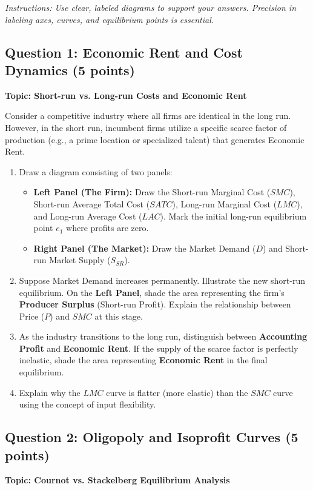 \documentclass[12pt, a4paper]{article}
\begin{document}
\textit{Instructions: Use clear, labeled diagrams to support your answers. Precision in labeling axes, curves, and equilibrium points is essential.}

\subsection*{Question 1: Economic Rent and Cost Dynamics (5 points)}
\textbf{Topic: Short-run vs. Long-run Costs and Economic Rent}

Consider a competitive industry where all firms are identical in the long run. However, in the short run, incumbent firms utilize a specific scarce factor of production (e.g., a prime location or specialized talent) that generates Economic Rent.

\begin{enumerate}
    \item[(a)] Draw a diagram consisting of two panels:
    \begin{itemize}
        \item \textbf{Left Panel (The Firm):} Draw the Short-run Marginal Cost ($SMC$), Short-run Average Total Cost ($SATC$), Long-run Marginal Cost ($LMC$), and Long-run Average Cost ($LAC$). Mark the initial long-run equilibrium point $e_1$ where profits are zero.
        \item \textbf{Right Panel (The Market):} Draw the Market Demand ($D$) and Short-run Market Supply ($S_{SR}$).
    \end{itemize}
    \item[(b)] Suppose Market Demand increases permanently. Illustrate the new short-run equilibrium. On the \textbf{Left Panel}, shade the area representing the firm's \textbf{Producer Surplus} (Short-run Profit). Explain the relationship between Price ($P$) and $SMC$ at this stage.
    \item[(c)] As the industry transitions to the long run, distinguish between \textbf{Accounting Profit} and \textbf{Economic Rent}. If the supply of the scarce factor is perfectly inelastic, shade the area representing \textbf{Economic Rent} in the final equilibrium.
    \item[(d)] Explain why the $LMC$ curve is flatter (more elastic) than the $SMC$ curve using the concept of input flexibility.
\end{enumerate}

\vspace{0.5cm}

\subsection*{Question 2: Oligopoly and Isoprofit Curves (5 points)}
\textbf{Topic: Cournot vs. Stackelberg Equilibrium Analysis}
\end{document}
